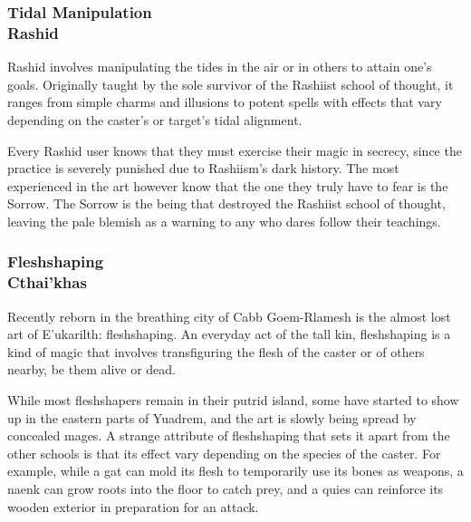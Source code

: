 \begin{linenumbers}
\subsubsection{Tidal Manipulation\\ \small{Rashid}} %
Rashid involves manipulating the tides in the air or in others to attain one's goals.
Originally taught by the sole survivor of the Rashiist school of thought, it ranges from simple charms and illusions to potent spells with effects that vary depending on the caster's or target's tidal alignment.

Every Rashid user knows that they must exercise their magic in secrecy, since the practice is severely punished due to Rashiism's dark history.
The most experienced in the art however know that the one they truly have to fear is the Sorrow.
The Sorrow is the being that destroyed the Rashiist school of thought, leaving the pale blemish as a warning to any who dares follow their teachings.

\subsubsection{Fleshshaping\\ \small{Cthai'khas}} %
Recently reborn in the breathing city of Cabb Goem-Rlamesh is the almost lost art of E'ukarilth: fleshshaping.
An everyday act of the tall kin, fleshshaping is a kind of magic that involves transfiguring the flesh of the caster or of others nearby, be them alive or dead.

While most fleshshapers remain in their putrid island, some have started to show up in the eastern parts of Yuadrem, and the art is slowly being spread by concealed mages.
A strange attribute of fleshshaping that sets it apart from the other schools is that its effect vary depending on the species of the caster.
For example, while a gat can mold its flesh to temporarily use its bones as weapons, a naenk can grow roots into the floor to catch prey, and a quies can reinforce its wooden exterior in preparation for an attack.

\end{linenumbers}
